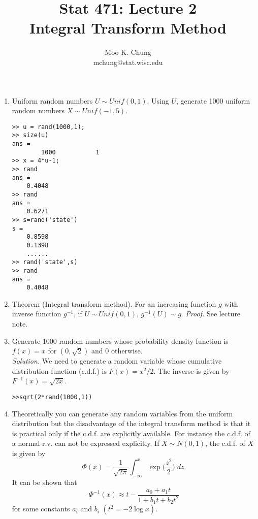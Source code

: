 \documentclass[12pt,twocolumn]{article} %
\begin{document}
\title{Stat 471: Lecture 2\\
Integral Transform Method}
\author{Moo K. Chung\\
mchung@stat.wisc.edu}
\maketitle \thispagestyle{empty}
\begin{enumerate}

\item Uniform random numbers $U \sim Unif(0,1)$. Using $U$,
generate 1000 uniform random numbers $X \sim Unif(-1,5)$.

\begin{verbatim}
>> u = rand(1000,1);
>> size(u)
ans =
        1000           1
>> x = 4*u-1;
>> rand
ans =
    0.4048
>> rand
ans =
    0.6271
>> s=rand('state')
s =
    0.8598
    0.1398
    ......
>> rand('state',s)
>> rand
ans =
    0.4048
\end{verbatim}

\item Theorem (Integral transform method). For an increasing
function $g$ with inverse function $g^{-1}$, if  $U \sim
Unif(0,1)$, $g^{-1}(U) \sim g$. {\em Proof.} See lecture note.

\item Generate 1000 random numbers whose probability density
function is $f(x) = x$ for $(0,\sqrt{2})$ and $0$ otherwise.\\
{\em Solution.} We need to generate a random variable whose
cumulative distribution function (c.d.f.) is $F(x)=x^2/2$. The
inverse is given by $F^{-1}(x) = \sqrt{2x}$.
\begin{verbatim}
>>sqrt(2*rand(1000,1))
\end{verbatim}

\item Theoretically you can generate any random variables from the
uniform distribution but the disadvantage of the integral
transform method is that it is practical only if the c.d.f. are
explicitly available. For instance the c.d.f. of a normal r.v. can
not be expressed explicitly. If $X \sim N(0,1)$, the c.d.f. of $X$
is given by
$$\Phi(x) = \frac{1}{\sqrt{2\pi}} \int_{-\infty}^x
\exp \Big(\frac{z^2}{2}\Big) \;dz.$$ It can be shown that
$$\Phi^{-1}(x) \approx t - \frac{a_0 + a_1 t}{1 + b_1 t + b_2
t^2}$$ for some constants $a_i$ and $b_i$ $(t^2= -2 \log x)$.



\end{enumerate}
\end{document}
